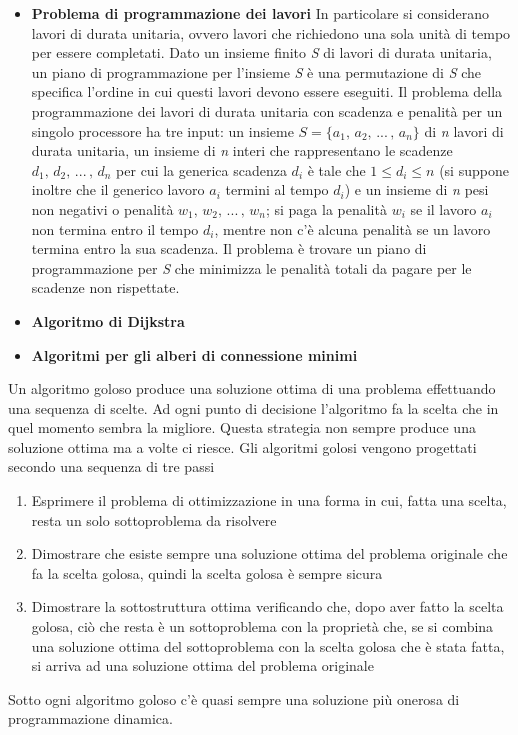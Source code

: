 \documentclass[10pt, a4paper]{report}
\begin{document}
\begin{itemize}
\item \textbf{Problema di programmazione dei lavori} In particolare si considerano lavori di durata unitaria, ovvero lavori che richiedono una sola unità di tempo per essere completati. Dato un insieme finito \textit{S} di lavori di durata unitaria, un piano di programmazione per l'insieme \textit{S} è una permutazione di \textit{S} che specifica l'ordine in cui questi lavori devono essere eseguiti. Il problema della programmazione dei lavori di durata unitaria con scadenza e penalità per un singolo processore ha tre input: un insieme $S = \{a_1,\,a_2,\,...\,,\,a_n\}$ di \textit{n} lavori di durata unitaria, un insieme di \textit{n} interi che rappresentano le scadenze $d_1,\,d_2,\,...\,,\,d_n$ per cui la generica scadenza $d_i$ è tale che $1 \leq d_i \leq n$ (si suppone inoltre che il generico lavoro $a_i$ termini al tempo $d_i$) e un insieme di \textit{n} pesi non negativi o penalità $w_1,\,w_2,\,...\,,\,w_n$; si paga la penalità $w_i$ se il lavoro $a_i$ non termina entro il tempo $d_i$, mentre non c'è alcuna penalità se un lavoro termina entro la sua scadenza. Il problema è trovare un piano di programmazione per \textit{S} che minimizza le penalità totali da pagare per le scadenze non rispettate.
\item \textbf{Algoritmo di Dijkstra}
\item \textbf{Algoritmi per gli alberi di connessione minimi}
\end{itemize}
Un algoritmo goloso produce una soluzione ottima di una problema effettuando una sequenza di scelte. Ad ogni punto di decisione l'algoritmo fa la scelta che in quel momento sembra la migliore. Questa strategia non sempre produce una soluzione ottima ma a volte ci riesce. Gli algoritmi golosi vengono progettati secondo una sequenza di tre passi
\begin{enumerate}
\item Esprimere il problema di ottimizzazione in una forma in cui, fatta una scelta, resta un solo sottoproblema da risolvere
\item Dimostrare che esiste sempre una soluzione ottima del problema originale che fa la scelta golosa, quindi la scelta golosa è sempre sicura
\item Dimostrare la sottostruttura ottima verificando che, dopo aver fatto la scelta golosa, ciò che resta è un sottoproblema con la proprietà che, se si combina una soluzione ottima del sottoproblema con la scelta golosa che è stata fatta, si arriva ad una soluzione ottima del problema originale
\end{enumerate}
Sotto ogni algoritmo goloso c'è quasi sempre una soluzione più onerosa di programmazione dinamica.
\end{document}
